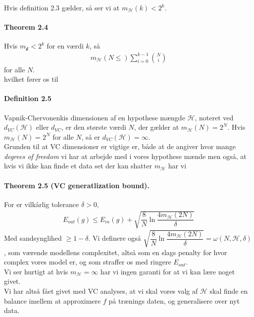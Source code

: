 \documentclass[paper=a4, fontsize=11pt]{scrartcl} %
\numberwithin{equation}{section} %
\numberwithin{figure}{section} %
\numberwithin{table}{section} %
\begin{document}
	Hvis definition 2.3 gælder, så ser vi at $m_\mathcal{H}(k)<2^k$.
	\paragraph{\textbf{Theorem 2.4}} Hvis $m_\mathcal{k}<2^k$ for en værdi $k$, så
	\begin{align*}
	m_\mathcal{H}(N\leq)\sum_{i=0}^{k-1} {{N}\choose{i}}
	\end{align*}
	for alle $N$. \\
	
	hvilket fører os til  
	\paragraph{\textbf{Definition 2.5}} Vapnik-Chervonenkis dimensionen af en hypothese mængde $\mathcal{H}$, noteret ved $d_{VC}(\mathcal{H})$ eller $d_{VC}$, er den største værdi $N$, der gælder at $m_{\mathcal{H}}(N)=2^N$. Hvis $m_\mathcal{H}(N)=2^N$ for alle $N$, så er $d_{VC}(\mathcal{H})=\infty$. \\
	
	Grunden til at VC dimensioner er vigtige er, både at de angiver hvor mange \textit{degrees of freedom} vi har at arbejde med i vores hypothese mænde men også, at hvis vi ikke kan finde et data set der kan shatter $m_\mathcal{H}$ har vi
	\paragraph{\textbf{Theorem 2.5} (VC generatlization bound).} For er vilkårlig tolerance $\delta>0$,
	\begin{align*}
	E_{out}(g)\leq E_{in}(g)+\sqrt{\dfrac{8}{N}\ln\dfrac{4m_\mathcal{H}(2N)}{\delta}}
	\end{align*}
	Med sandsynglihed $\geq 1-\delta$. Vi definere også $\sqrt{\dfrac{8}{N}\ln\dfrac{4m_\mathcal{H}(2N)}{\delta}}=\omega(N,\mathcal{H},\delta)$, som værende modellens complexitet, altså som en slags penalty for hvor complex vores model er, og som straffer os med ringere $E_{out}$. \\
	
	Vi ser hurtigt at hvis $m_\mathcal{H}=\infty$ har vi ingen garanti for at vi kan lære noget givet. \\
	
	Vi har altså fået givet med VC analyses, at vi skal vores valg af $\mathcal{H}$ skal finde en balance imellem at approximere $f$ på trænings daten, og generalisere over nyt data.
	
\end{document}
